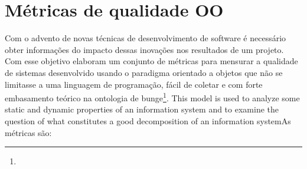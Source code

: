 

\section{Métricas de qualidade OO}
\label{sec:metrics}

Com o advento de novas técnicas de desenvolvimento de software é necessário
obter informações do impacto dessas inovações nos resultados de um projeto. Com
esse objetivo  elaboram um conjunto de métricas para
mensurar a qualidade de sistemas desenvolvido usando o paradigma orientado a objetos que
não se limitasse a uma linguagem de programação, fácil de coletar e com forte
embasamento teórico na ontologia de bunge\footnote{}. This model is used to analyze
some static and dynamic properties of an information system and to examine the
question of what constitutes a good decomposition of an information
system\cite{WandWeber}As métricas são:




